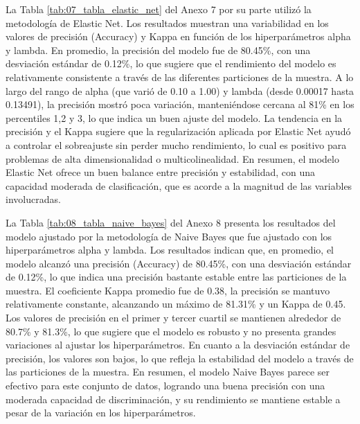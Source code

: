 \documentclass[12pt,a4paper,onecolumn]{article}
\begin{document}
La Tabla \ref{tab:07_tabla_elastic_net} del Anexo 7 por su parte utilizó la metodología de Elastic Net. Los resultados muestran una variabilidad en los valores de precisión (Accuracy) y Kappa en función de los hiperparámetros alpha y lambda. En promedio, la precisión del modelo fue de 80.45\%, con una desviación estándar de 0.12\%, lo que sugiere que el rendimiento del modelo es relativamente consistente a través de las diferentes particiones de la muestra. A lo largo del rango de alpha (que varió de 0.10 a 1.00) y lambda (desde 0.00017 hasta 0.13491), la precisión mostró poca variación, manteniéndose cercana al 81\% en los percentiles 1,2 y 3, lo que indica un buen ajuste del modelo. La tendencia en la precisión y el Kappa sugiere que la regularización aplicada por Elastic Net ayudó a controlar el sobreajuste sin perder mucho rendimiento, lo cual es positivo para problemas de alta dimensionalidad o multicolinealidad. En resumen, el modelo Elastic Net ofrece un buen balance entre precisión y estabilidad, con una capacidad moderada de clasificación, que es acorde a la magnitud de las variables involucradas.

La Tabla \ref{tab:08_tabla_naive_bayes} del Anexo 8 presenta los resultados del modelo ajustado por la metodología de Naive Bayes que fue ajustado con los hiperparámetros alpha y lambda. Los resultados indican que, en promedio, el modelo alcanzó una precisión (Accuracy) de 80.45\%, con una desviación estándar de 0.12\%, lo que indica una precisión bastante estable entre las particiones de la muestra. El coeficiente Kappa promedio fue de 0.38, la precisión se mantuvo relativamente constante, alcanzando un máximo de 81.31\% y un Kappa de 0.45. Los valores de precisión en el primer y tercer cuartil se mantienen alrededor de 80.7\% y 81.3\%, lo que sugiere que el modelo es robusto y no presenta grandes variaciones al ajustar los hiperparámetros. En cuanto a la desviación estándar de precisión, los valores son bajos, lo que refleja la estabilidad del modelo a través de las particiones de la muestra. En resumen, el modelo Naive Bayes parece ser efectivo para este conjunto de datos, logrando una buena precisión con una moderada capacidad de discriminación, y su rendimiento se mantiene estable a pesar de la variación en los hiperparámetros.
\end{document}
